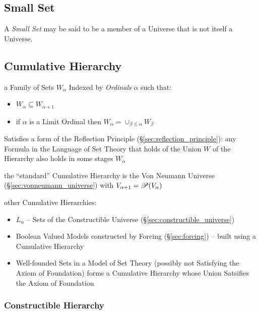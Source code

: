 \subsection{Small Set}\label{sec:small_set}

A \emph{Small Set} may be said to be a member of a Universe that is
not itself a Universe.



\subsection{Cumulative Hierarchy}\label{sec:cumulative_hierarchy}

a Family of Sets $W_\alpha$ Indexed by \emph{Ordinals} $\alpha$ such
that:
\begin{itemize}
  \item $W_\alpha \subseteq W_{\alpha+1}$
  \item if $\alpha$ is a Limit Ordinal then $W_\alpha = \cup_{\beta
    \leq \alpha} W_\beta$
\end{itemize}

Satisfies a form of the Reflection Principle
(\S\ref{sec:reflection_principle}): any Formula in the Language of Set
Theory that holds of the Union $W$ of the Hierarchy also holds in some
stages $W_\alpha$

the ``standard'' Cumulative Hierarchy is the Von Neumann Universe
(\S\ref{sec:vonneumann_universe}) with $V_{\alpha+1} = \mathscr{P}(V_\alpha)$

other Cumulative Hierarchies:
\begin{itemize}
  \item $L_\alpha$ -- Sets of the Constructible Universe
    (\S\ref{sec:constructible_universe})
  \item Boolean Valued Models constructed by Forcing
    (\S\ref{sec:forcing}) -- built using a Cumulative Hierarchy
  \item Well-founded Sets in a Model of Set Theory (possibly not
    Satisfying the Axiom of Foundation) forms a Cumulative Hierarchy
    whose Union Satsifies the Axiom of Foundation
\end{itemize}



\subsubsection{Constructible Hierarchy}\label{sec:constructible_hierarchy}

